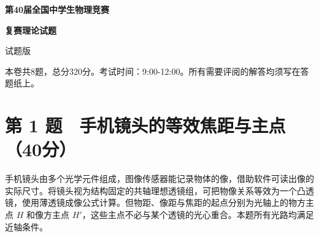 \documentclass[12pt,a4paper,fontset=fandol]{ctexart}
\begin{document}
\begin{titlepage}
\thispagestyle{empty}
\vspace*{27mm}
\begin{center}
{\LARGE\bfseries 第40届全国中学生物理竞赛\par}
\vspace{8mm}
{\LARGE\bfseries 复赛理论试题\par}
\vspace{17mm}
{\Large 试题版\par}
\end{center}
\vfill
\end{titlepage}
\setcounter{page}{1}
本卷共8题，总分320分。考试时间：9:00-12:00。所有需要评阅的解答均须写在答题纸上。

\section{第 1
题　手机镜头的等效焦距与主点（40分）}\label{ux7b2c-1-ux9898-ux624bux673aux955cux5934ux7684ux7b49ux6548ux7126ux8dddux4e0eux4e3bux70b940ux5206}

手机镜头由多个光学元件组成，图像传感器能记录物体的像，借助软件可读出像的实际尺寸。将镜头视为结构固定的共轴理想透镜组，可把物像关系等效为一个凸透镜，使用薄透镜成像公式计算。但物距、像距与焦距的起点分别为光轴上的物方主点
\(H\) 和像方主点
\(H'\)，这些主点不必与某个透镜的光心重合。本题所有光路均满足近轴条件。

\begin{center}
\begin{minipage}{\linewidth}
\centering\begingroup{}
\ifdim\wd\diagrambox>.88\linewidth
\sbox{\diagrambox}{\resizebox{.88\linewidth}{!}{\usebox{\diagrambox}}}\fi
\ifdim\ht\diagrambox>.38\textheight
\resizebox{!}{.38\textheight}{\usebox{\diagrambox}}
\else\usebox{\diagrambox}\fi
\par{}\endgroup\end{minipage}\end{center}
\end{document}
